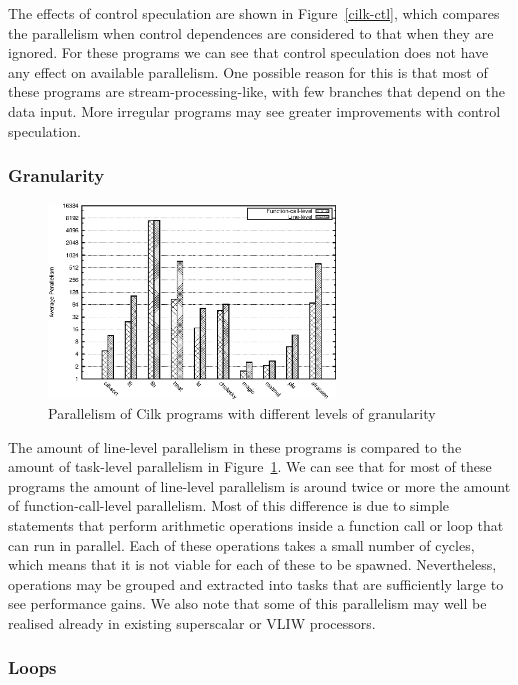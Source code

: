 The effects of control speculation are shown in Figure~\ref{cilk-ctl}, which compares the parallelism when control dependences are considered to that when they are ignored.
For these programs we can see that control speculation does not have any effect on available parallelism.
One possible reason for this is that most of these programs are stream-processing-like, with few branches that depend on the data input.
More irregular programs may see greater improvements with control speculation.

\subsubsection{Granularity}

\begin{figure}
 \centering
 \includegraphics[width=3in]{cilk-gran}
 \caption{Parallelism of Cilk programs with different levels of granularity}
 \label{cilk-gran}
\end{figure}

The amount of line-level parallelism in these programs is compared to the amount of task-level parallelism in Figure~\ref{cilk-gran}.
We can see that for most of these programs the amount of line-level parallelism is around twice or more the amount of function-call-level parallelism.
Most of this difference is due to simple statements that perform arithmetic operations inside a function call or loop that can run in parallel.
Each of these operations takes a small number of cycles, which means that it is not viable for each of these to be spawned.
Nevertheless, operations may be grouped and extracted into tasks that are sufficiently large to see performance gains.
We also note that some of this parallelism may well be realised already in existing superscalar or VLIW processors.

\subsubsection{Loops}

